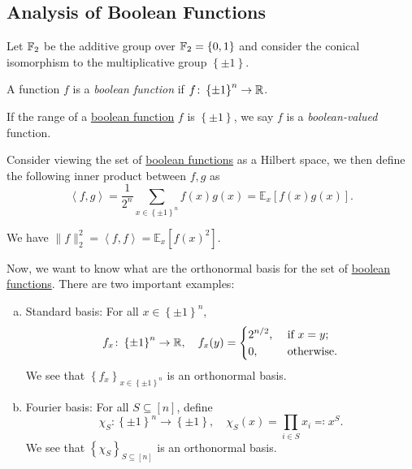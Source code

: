 \subsection{Analysis of Boolean Functions}

\begin{definition*}
	Let \(\mathbb{\MakeUppercase{f}} _2\) be the additive group over \(\mathbb{\MakeUppercase{f}} _2 = \left\{ 0, 1 \right\} \) and consider the conical isomorphism to the multiplicative group \(\left\{ \pm 1 \right\} \).
	\begin{definition}\label{def:boolean-function}
		A function \(f\) is a \emph{boolean function} if \(f\colon \left\{ \pm 1 \right\} ^n \to \mathbb{\MakeUppercase{r}} \).
	\end{definition}

	\begin{definition}\label{def:boolean-valued}
		If the range of a \hyperref[def:boolean-function]{boolean function} \(f\) is \(\left\{ \pm 1 \right\} \), we say \(f\) is a \emph{boolean-valued} function.
	\end{definition}
\end{definition*}

Consider viewing the set of \hyperref[def:boolean-function]{boolean functions} as a Hilbert space, we then define the following inner product between \(f, g\) as
\[
	\left\langle f, g \right\rangle
	= \frac{1}{2^n} \sum_{x\in \left\{ \pm 1 \right\} ^n} f(x) g(x)
	= \mathbb{E}_{x}\left[f(x) g(x) \right] .
\]
\begin{note}
	We have \(\lVert f \rVert _2 ^2 = \left\langle f, f \right\rangle = \mathbb{E}_{x}\left[f(x)^2 \right] \).
\end{note}

Now, we want to know what are the orthonormal basis for the set of \hyperref[def:boolean-function]{boolean functions}. There are two important examples:
\begin{enumerate}[(a)]
	\item Standard basis: For all \(x\in \left\{ \pm 1\right\}^n\),
	      \[
		      f_x \colon \left\{ \pm 1 \right\} ^n \to  \mathbb{\MakeUppercase{r}} ,\quad
		      f_x (y) = \begin{dcases}
			      2^{n / 2}, & \text{ if } x=y ;   \\
			      0,         & \text{ otherwise} .
		      \end{dcases}
	      \]
	      We see that \(\left\{ f_x \right\} _{x\in \left\{ \pm 1 \right\} ^n}\) is an orthonormal basis.
	\item Fourier basis: For all \(S \subseteq [n]\), define
	      \[
		      \chi _S \colon \left\{ \pm 1 \right\} ^n \to  \left\{ \pm 1 \right\} ,\quad
		      \chi _S (x) = \prod_{i\in S} x_i \eqqcolon x^S.
	      \]
	      We see that \(\left\{ \chi _S \right\}_{S \subseteq [n]} \) is an orthonormal basis.
\end{enumerate}

